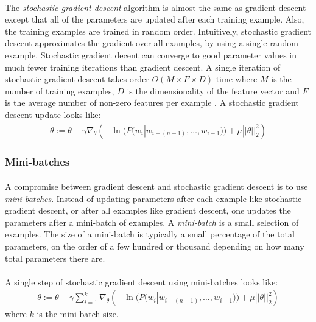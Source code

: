 \paragraph{}
The \emph{stochastic gradient descent} algorithm is almost the same as gradient descent except that all of the parameters are updated after each training example. Also, the training examples are trained in random order. Intuitively, stochastic gradient descent approximates the gradient over all examples, by using a single random example. Stochastic gradient decent can converge to good parameter values in much fewer training iterations than gradient descent. A single iteration of stochastic gradient descent takes order $O(M\times F \times D)$ time where $M$ is the number of training examples, $D$ is the dimensionality of the feature vector and $F$ is the average number of non-zero features per example \cite{Elkan2013}. 
A stochastic gradient descent update looks like:
\begin{align}
\theta := \theta - \gamma \nabla_\theta \left( -\ln(P(w_i | w_{i-(n-1)},\dots, w_{i-1})) +  \mu ||\theta||^2_2 \right)
\end{align}
\subsubsection{Mini-batches}
\paragraph{}
A compromise between gradient descent and stochastic gradient descent is to use \emph{mini-batches}. Instead of updating parameters after each example like stochastic gradient descent, or after all examples like gradient descent, one updates the parameters after a mini-batch of examples. A \emph{mini-batch} is a small selection of examples. The size of a mini-batch is typically a small percentage of the total parameters, on the order of a few hundred or thousand depending on how many total parameters there are.
\paragraph{}
A single step of stochastic gradient descent using mini-batches looks like:
\begin{align}
\theta := \theta - \gamma  \sum_{i=1}^{k} \nabla_\theta \left( -\ln(P(w_i | w_{i-(n-1)},\dots, w_{i-1})) +  \mu ||\theta||^2_2 \right)
\end{align}
where $k$ is the mini-batch size.

